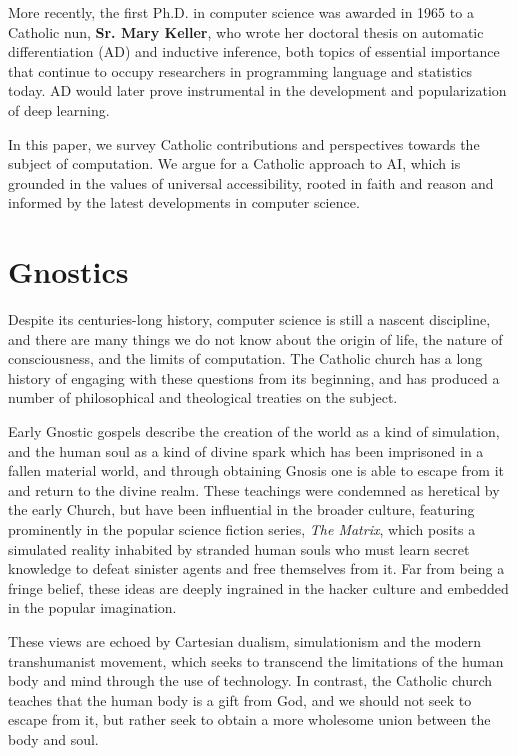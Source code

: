 \documentclass[sigplan,nonacm]{acmart}\settopmatter{printfolios=false,printccs=false,printacmref=false}
\begin{document}
  More recently, the first Ph.D. in computer science was awarded in 1965 to a Catholic nun, \textbf{Sr. Mary Keller}, who wrote her doctoral thesis on automatic differentiation (AD) and inductive inference, both topics of essential importance that continue to occupy researchers in programming language and statistics today. AD would later prove instrumental in the development and popularization of deep learning.

  In this paper, we survey Catholic contributions and perspectives towards the subject of computation. We argue for a Catholic approach to AI, which is grounded in the values of universal accessibility, rooted in faith and reason and informed by the latest developments in computer science.

 \section{Gnostics}

  Despite its centuries-long history, computer science is still a nascent discipline, and there are many things we do not know about the origin of life, the nature of consciousness, and the limits of computation. The Catholic church has a long history of engaging with these questions from its beginning, and has produced a number of philosophical and theological treaties on the subject.

  Early Gnostic gospels describe the creation of the world as a kind of simulation, and the human soul as a kind of divine spark which has been imprisoned in a fallen material world, and through obtaining Gnosis one is able to escape from it and return to the divine realm. These teachings were condemned as heretical by the early Church, but have been influential in the broader culture, featuring prominently in the popular science fiction series, \textit{The Matrix}, which posits a simulated reality inhabited by stranded human souls who must learn secret knowledge to defeat sinister agents and free themselves from it. Far from being a fringe belief, these ideas are deeply ingrained in the hacker culture and embedded in the popular imagination.

  These views are echoed by Cartesian dualism, simulationism and the modern transhumanist movement, which seeks to transcend the limitations of the human body and mind through the use of technology. In contrast, the Catholic church teaches that the human body is a gift from God, and we should not seek to escape from it, but rather seek to obtain a more wholesome union between the body and soul.
\end{document}
